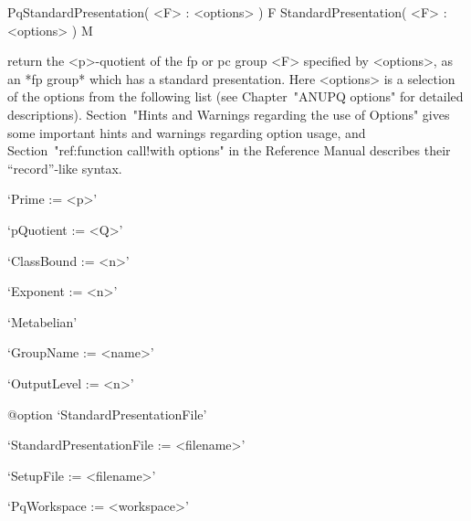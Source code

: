 
\>PqStandardPresentation( <F> : <options> ) F
\>StandardPresentation( <F> : <options> ) M

return the <p>-quotient of the fp or pc group <F> specified by <options>,
as an *fp group* which has a standard presentation. Here <options>  is  a
selection of the options from  the  following  list  (see  Chapter~"ANUPQ
options"  for  detailed  descriptions).   Section~"Hints   and   Warnings
regarding the use of Options" gives some  important  hints  and  warnings
regarding option usage, and Section~"ref:function call!with  options"  in
the {\GAP} Reference Manual describes their ``record''-like syntax.

\beginlist%

\item{}`Prime := <p>'

\item{}`pQuotient := <Q>'

\item{}`ClassBound := <n>'

\item{}`Exponent := <n>'

\item{}`Metabelian'

\item{}`GroupName := <name>'

\item{}`OutputLevel := <n>'

%
{@option \noexpand`StandardPresentationFile'}
\item{}`StandardPresentationFile := <filename>'

\item{}`SetupFile := <filename>'

\item{}`PqWorkspace := <workspace>'

